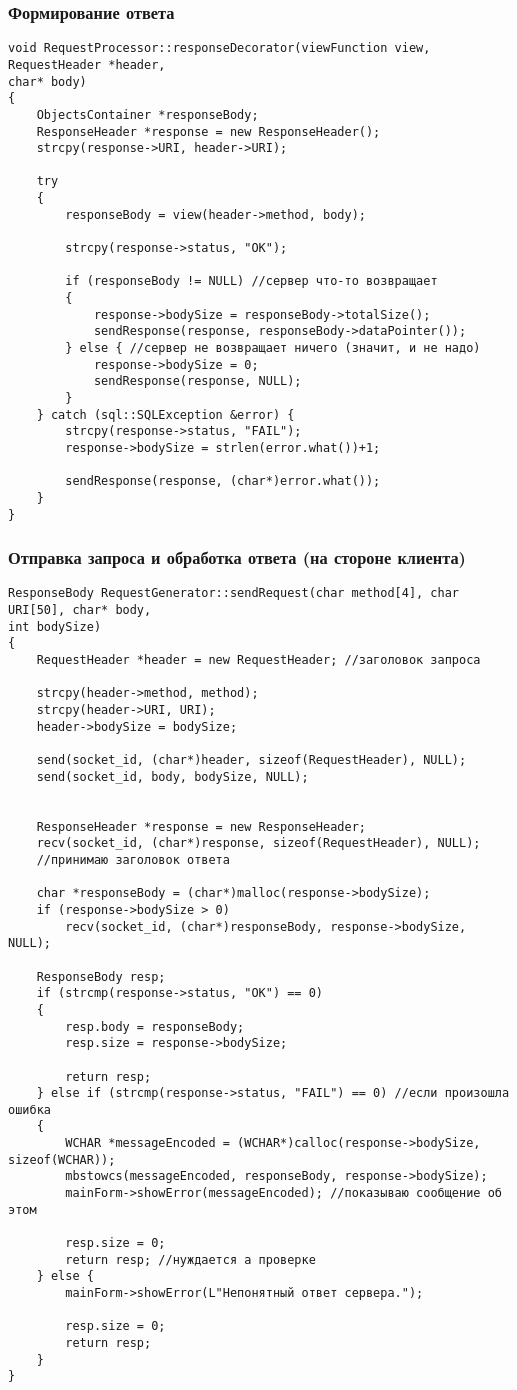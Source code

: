 \subsubsection{Формирование ответа}
\begin{verbatim}
void RequestProcessor::responseDecorator(viewFunction view, RequestHeader *header,
char* body)
{
	ObjectsContainer *responseBody;
	ResponseHeader *response = new ResponseHeader();
	strcpy(response->URI, header->URI);

	try
	{
		responseBody = view(header->method, body);

		strcpy(response->status, "OK");

		if (responseBody != NULL) //сервер что-то возвращает
		{
			response->bodySize = responseBody->totalSize();
			sendResponse(response, responseBody->dataPointer());
		} else { //сервер не возвращает ничего (значит, и не надо)
			response->bodySize = 0;
			sendResponse(response, NULL);
		}
	} catch (sql::SQLException &error) {
		strcpy(response->status, "FAIL");
		response->bodySize = strlen(error.what())+1;

		sendResponse(response, (char*)error.what());
	}
}
\end{verbatim}

\subsubsection{Отправка запроса и обработка ответа (на стороне клиента)}
\begin{verbatim}
ResponseBody RequestGenerator::sendRequest(char method[4], char URI[50], char* body, 
int bodySize)
{
	RequestHeader *header = new RequestHeader; //заголовок запроса

	strcpy(header->method, method);
	strcpy(header->URI, URI);
	header->bodySize = bodySize;

	send(socket_id, (char*)header, sizeof(RequestHeader), NULL);
	send(socket_id, body, bodySize, NULL);


	ResponseHeader *response = new ResponseHeader;
	recv(socket_id, (char*)response, sizeof(RequestHeader), NULL); 
	//принимаю заголовок ответа

	char *responseBody = (char*)malloc(response->bodySize);
	if (response->bodySize > 0)
		recv(socket_id, (char*)responseBody, response->bodySize, NULL);

	ResponseBody resp;
	if (strcmp(response->status, "OK") == 0)
	{
		resp.body = responseBody;
		resp.size = response->bodySize;

		return resp;
	} else if (strcmp(response->status, "FAIL") == 0) //если произошла ошибка
	{
		WCHAR *messageEncoded = (WCHAR*)calloc(response->bodySize, sizeof(WCHAR));
		mbstowcs(messageEncoded, responseBody, response->bodySize);
		mainForm->showError(messageEncoded); //показываю сообщение об этом
		
		resp.size = 0;
		return resp; //нуждается а проверке
	} else {
		mainForm->showError(L"Непонятный ответ сервера.");
		
		resp.size = 0;
		return resp;
	}
}
\end{verbatim}

